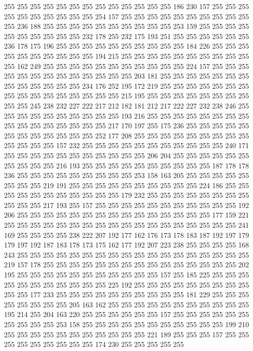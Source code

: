 255 255 255 255 255 255 255 255 255 255 255 255 255 186 230 157 255 255 255 255
255 255 255 255 255 255 254 157 255 255 255 255 255 255 255 255 255 255 255 236
188 255 255 255 255 255 255 255 255 255 255 253 159 255 255 255 255 255 255 255
255 255 255 232 178 255 232 175 193 251 255 255 255 255 255 255 236 178 175 196
255 255 255 255 255 255 255 255 255 255 184 226 255 255 255 255 255 255 255 255
255 255 194 215 255 255 255 255 255 255 255 255 255 255 255 162 249 255 255 255
255 255 255 255 255 255 255 255 224 157 255 255 255 255 255 255 255 255 255 255
255 255 255 203 181 255 255 255 255 255 255 255 255 255 255 255 255 255 234 176
252 195 172 219 255 255 255 255 255 255 255 255 255 255 255 255 255 255 255 255
215 195 255 255 255 255 255 255 255 255 255 255 245 238 232 227 222 217 212 182
181 212 217 222 227 232 238 246 255 255 255 255 255 255 255 255 255 255 193 216
255 255 255 255 255 255 255 255 255 255 255 255 255 255 255 255 217 170 197 255
175 236 255 255 255 255 255 255 255 255 255 255 255 255 252 177 208 255 255 255
255 255 255 255 255 255 255 255 255 255 157 232 255 255 255 255 255 255 255 255
255 255 255 240 171 255 255 255 255 255 255 255 255 255 255 255 206 204 255 255
255 255 255 255 255 255 255 255 216 193 255 255 255 255 255 255 255 255 255 255
187 178 178 236 255 255 255 255 255 255 255 255 255 253 158 163 205 255 255 255
255 255 255 255 255 219 191 255 255 255 255 255 255 255 255 255 255 224 186 255
255 255 255 255 255 255 255 255 255 255 179 232 255 255 255 255 255 255 255 255
255 255 255 217 193 255 157 255 255 255 255 255 255 255 255 255 255 255 192 206
255 255 255 255 255 255 255 255 255 255 255 255 255 255 255 177 159 221 255 255
255 255 255 255 255 255 255 255 255 255 255 255 255 255 255 255 241 169 255 255
255 255 238 222 207 192 177 162 176 173 178 183 187 192 197 179 179 197 192 187
183 178 173 175 162 177 192 207 223 238 255 255 255 255 168 243 255 255 255 255
255 255 255 255 255 255 255 255 255 255 255 255 255 255 219 157 178 255 255 255
255 255 255 255 255 255 255 255 255 255 255 255 202 195 255 255 255 255 255 255
255 255 255 255 255 157 255 185 225 255 255 255 255 255 255 255 255 255 255 255
225 192 255 255 255 255 255 255 255 255 255 255 255 177 233 255 255 255 255 255
255 255 255 255 255 181 229 255 255 255 255 255 255 255 255 205 163 162 255 255
255 255 255 255 255 255 255 255 255 195 214 255 204 163 220 255 255 255 255 255
255 157 255 255 255 255 255 255 255 255 255 255 253 158 255 255 255 255 255 255
255 255 255 255 255 199 210 255 255 255 255 255 255 255 255 255 255 255 221 189
255 255 255 157 255 255 255 255 255 255 255 255 255 174 230 255 255 255 255 255
